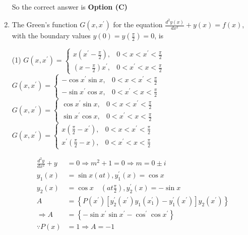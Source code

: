 \begin{enumerate}[label=\color{ocre}\textbf{\arabic*.}]
\begin{answer}
\begin{align*}
		\end{align*}
		So the correct answer is \textbf{Option (C)}
	\end{answer}
	\item  The Green's function $G\left(x, x^{\prime}\right)$ for the equation $\frac{d^{2} y(x)}{d x^{2}}+y(x)=f(x)$, with the boundary values $y(0)=y\left(\frac{\pi}{2}\right)=0$, is
	{}
	\begin{tasks}(1)
		\task[\textbf{A.}] $G\left(x, x^{\prime}\right)=\left\{\begin{array}{ll}x\left(x^{\prime}-\frac{\pi}{2}\right), & 0<x<x^{\prime}<\frac{\pi}{2} \\ \left(x-\frac{\pi}{2}\right) x^{\prime}, & 0<x^{\prime}<x<\frac{\pi}{2}\end{array}\right.$
		\task[\textbf{B.}] $G\left(x, x^{\prime}\right)=\left\{\begin{array}{ll}-\cos x^{\prime} \sin x, & 0<x<x^{\prime}<\frac{\pi}{2} \\ -\sin x^{\prime} \cos x, & 0<x^{\prime}<x<\frac{\pi}{2}\end{array}\right.$
		\task[\textbf{C.}] $G\left(x, x^{\prime}\right)=\left\{\begin{array}{ll}\cos x^{\prime} \sin x, & 0<x<x^{\prime}<\frac{\pi}{2} \\ \sin x^{\prime} \cos x, & 0<x^{\prime}<x<\frac{\pi}{2}\end{array}\right.$
		\task[\textbf{D.}] $G\left(x, x^{\prime}\right)=\left\{\begin{array}{ll}x\left(\frac{\pi}{2}-x^{\prime}\right), & 0<x<x^{\prime}<\frac{\pi}{2} \\ x^{\prime}\left(\frac{\pi}{2}-x\right), & 0<x^{\prime}<x<\frac{\pi}{2}\end{array}\right.$
	\end{tasks}
	\begin{answer}
		\begin{align*}
		\frac{d^{2} y}{d x^{2}}+y&=0 \Rightarrow m^{2}+1=0 \Rightarrow m=0 \pm i\\
		y_{1}(x)&=\sin x(a t), y_{1}^{\prime}(x)=\cos x\\
		y_{2}(x)&=\cos x \quad\left(a t \frac{\pi}{2}\right), y_{2}^{\prime}(x)=-\sin x\\
		A&=\left\{P\left(x^{\prime}\right)\left[y_{2}^{\prime}\left(x^{\prime}\right) y_{1}\left(x_{1}^{\prime}\right)-y_{1}^{\prime}\left(x^{\prime}\right)\right] y_{2}\left(x^{\prime}\right)\right\}\\
		\Rightarrow A&=\left\{-\sin x^{\prime} \sin x^{\prime}-\cos ^{\prime} \cos x^{\prime}\right\} \\ \because P(x)&=1 \Rightarrow A=-1\\

\end{align*}
\end{answer}
\end{enumerate}
